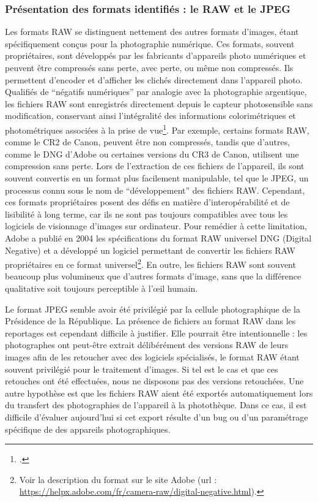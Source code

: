 \subsubsection*{Présentation des formats identifiés : le RAW et le JPEG}

Les formats RAW se distinguent nettement des autres formats d'images, étant spécifiquement conçus pour la photographie numérique. Ces formats, souvent propriétaires, sont développés par les fabricants d'appareils photo numériques et peuvent être compressés sans perte, avec perte, ou même non compressés. Ils permettent d'encoder et d'afficher les clichés directement dans l'appareil photo. Qualifiés de \enquote{négatifs numériques} par analogie avec la photographie argentique, les fichiers RAW sont enregistrés directement depuis le capteur photosensible sans modification, conservant ainsi l'intégralité des informations colorimétriques et photométriques associées à la prise de vue\footcite[pp.79-80]{chirolletPenserPhotographieNumerique2015}. Par exemple, certains formats RAW, comme le CR2 de Canon, peuvent être non compressés, tandis que d'autres, comme le DNG d'Adobe ou certaines versions du CR3 de Canon, utilisent une compression sans perte. Lors de l'extraction de ces fichiers de l'appareil, ils sont souvent convertis en un format plus facilement manipulable, tel que le JPEG, un processus connu sous le nom de \enquote{développement} des fichiers RAW. Cependant, ces formats propriétaires posent des défis en matière d'interopérabilité et de lisibilité à long terme, car ils ne sont pas toujours compatibles avec tous les logiciels de visionnage d'images sur ordinateur. Pour remédier à cette limitation, Adobe a publié en 2004 les spécifications du format RAW universel DNG (Digital Negative) et a développé un logiciel permettant de convertir les fichiers RAW propriétaires en ce format universel\footnote{Voir la description du format sur le site Adobe (url : \url{https://helpx.adobe.com/fr/camera-raw/digital-negative.html}).}. En outre, les fichiers RAW sont souvent beaucoup plus volumineux que d'autres formats d'image, sans que la différence qualitative soit toujours perceptible à l'\oe{}il humain.

Le format JPEG semble avoir été privilégié par la cellule photographique de la Présidence de la République.  La présence de fichiers au format RAW dans les reportages est cependant difficile à justifier. Elle pourrait être intentionnelle : les photographes ont peut-être extrait délibérément des versions RAW de leurs images afin de les retoucher avec des logiciels spécialisés, le format RAW étant souvent privilégié pour le traitement d'images. Si tel est le cas et que ces retouches ont été effectuées, nous ne disposons pas des versions retouchées. Une autre hypothèse est que les fichiers RAW aient été exportés automatiquement lors du transfert des photographies de l'appareil à la photothèque. Dans ce cas, il est difficile d'évaluer aujourd'hui si cet export résulte d'un bug ou d'un paramétrage spécifique de des appareils photographiques.

